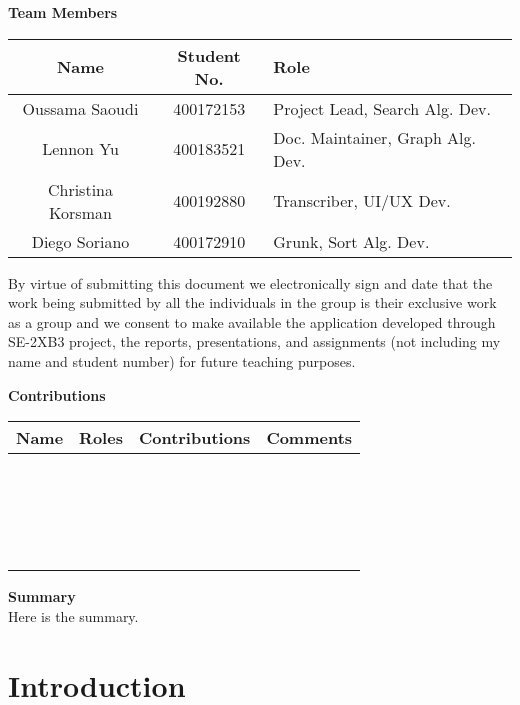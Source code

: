 \documentclass[12pt]{article}
\begin{document}
\Large \noindent \textbf{Team Members}\\
\normalsize
\begin{center}
    \begin{tabular}{|| c | c | l ||} 
    \hline
    Name & Student No. & Role\\
    \hline\hline
    Oussama Saoudi & 400172153 & Project Lead, Search Alg. Dev. \\ 
    \hline
    Lennon Yu & 400183521 & Doc. Maintainer, Graph Alg. Dev. \\
    \hline
    Christina Korsman & 400192880 & Transcriber, UI/UX Dev. \\
    \hline
    Diego Soriano & 400172910 & Grunk, Sort Alg. Dev. \\
    \hline
\end{tabular}
\end{center}

\normalsize
By virtue of submitting this document we electronically sign and date
that the work being submitted by all the individuals in the group is
their exclusive work as a group and we consent to make available the
application developed through SE-2XB3 project, the reports,
presentations, and assignments (not including my name and student number)
for future teaching purposes. 

\newpage
\Large \textbf{Contributions}
\normalsize
\begin{center}
    \begin{tabular}{|| c | c | l | p{7cm} ||} 
    \hline
    Name & Roles & Contributions & Comments\\
    \hline\hline
    ~ & ~ & ~ \\ 
    \hline
    ~ & ~ & ~ \\
    \hline
    ~ & ~ & ~ \\
    \hline
    ~ & ~ & ~ \\
    \hline
\end{tabular}
\end{center}

\newpage
\Large \noindent \textbf{Summary}\\
\normalsize
Here is the summary.

\newpage
\large
\tableofcontents

\section{Introduction}
   
\end{document}

